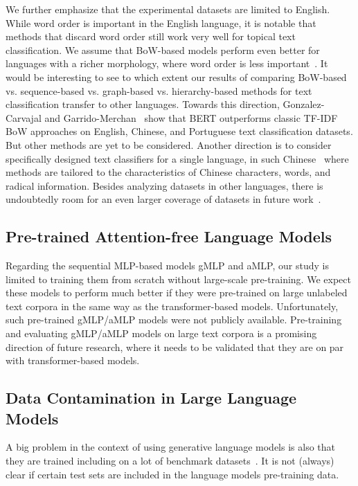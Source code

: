 \documentclass[acmsmall,nonacm]{acmart}
\newcommand{\GenLMs}{generative language models\xspace}
\begin{document}
We further emphasize that the experimental datasets are limited to English.
While word order is important in the English language, 
it is notable that methods that discard word order still work very well for topical text classification.
We assume that BoW-based models perform even better for languages with a richer morphology, where word order is less important~\cite{nowak_emergence_2016}.
It would be interesting to see to which extent our results of comparing BoW-based vs. sequence-based vs. graph-based vs. hierarchy-based methods for text classification transfer to other languages.
Towards this direction, Gonzalez-Carvajal and Garrido-Merchan~\cite{gonzales-2020-comparing-bert} show that BERT outperforms classic TF-IDF BoW approaches on English, Chinese, and Portuguese text classification datasets.
But other methods are yet to be considered.
Another direction is to consider specifically designed text classifiers for a single language, \eg in such Chinese~\cite{9837023-chinese} where methods are tailored to the characteristics of Chinese characters, words, and radical information.
Besides analyzing datasets in other languages, there is undoubtedly room for an even larger coverage of datasets in future work~\cite{Bhatia16}. 

\subsection{Pre-trained Attention-free Language Models}
Regarding the sequential MLP-based models gMLP and aMLP, our study is limited to training them from scratch without large-scale pre-training. 
We expect these models to perform much better if they were pre-trained on large unlabeled text corpora in the same way as the transformer-based models.
Unfortunately, such pre-trained gMLP/aMLP models were not publicly available. Pre-training and evaluating gMLP/aMLP models on large text corpora is a promising direction of future research, where it needs to be validated that they are on par with transformer-based models.

\subsection{Data Contamination in Large Language Models}
A big problem in the context of using \GenLMs is also that they are trained including on a lot of benchmark datasets~\cite{balloccuLeakCheatRepeat2024}.
It is not (always) clear if certain test sets are included in the language models pre-training data.
\end{document}

